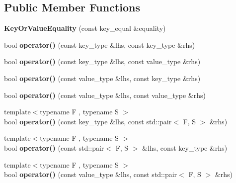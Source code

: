 \subsection*{Public Member Functions}
\begin{DoxyCompactItemize}
\item 
{\bfseries Key\+Or\+Value\+Equality} (const key\+\_\+equal \&equality)\label{structska_1_1detailv3_1_1KeyOrValueEquality_ae01de1db32c5e78bb02eb2a4b39038d6}

\item 
bool {\bfseries operator()} (const key\+\_\+type \&lhs, const key\+\_\+type \&rhs)\label{structska_1_1detailv3_1_1KeyOrValueEquality_a1f49bb215f288d746d81bd7c13f4e1a3}

\item 
bool {\bfseries operator()} (const key\+\_\+type \&lhs, const value\+\_\+type \&rhs)\label{structska_1_1detailv3_1_1KeyOrValueEquality_a976fa386f1387dde3457f0c67f1034b9}

\item 
bool {\bfseries operator()} (const value\+\_\+type \&lhs, const key\+\_\+type \&rhs)\label{structska_1_1detailv3_1_1KeyOrValueEquality_a209e09a271461a963b34eb0a75da6fcf}

\item 
bool {\bfseries operator()} (const value\+\_\+type \&lhs, const value\+\_\+type \&rhs)\label{structska_1_1detailv3_1_1KeyOrValueEquality_a0df018fa35a9d286e05dbab4ada0c113}

\item 
{\footnotesize template$<$typename F , typename S $>$ }\\bool {\bfseries operator()} (const key\+\_\+type \&lhs, const std\+::pair$<$ F, S $>$ \&rhs)\label{structska_1_1detailv3_1_1KeyOrValueEquality_a3f650d3490f8b2e6b775f972bdeaecc2}

\item 
{\footnotesize template$<$typename F , typename S $>$ }\\bool {\bfseries operator()} (const std\+::pair$<$ F, S $>$ \&lhs, const key\+\_\+type \&rhs)\label{structska_1_1detailv3_1_1KeyOrValueEquality_a7c47486d4150c2db2ad0b67dffde5523}

\item 
{\footnotesize template$<$typename F , typename S $>$ }\\bool {\bfseries operator()} (const value\+\_\+type \&lhs, const std\+::pair$<$ F, S $>$ \&rhs)\label{structska_1_1detailv3_1_1KeyOrValueEquality_ac4a05483fd81f73359f6a238dd58e735}


\end{DoxyCompactItemize}
